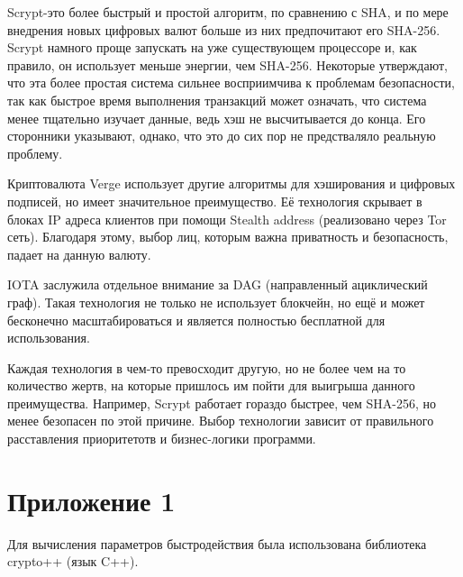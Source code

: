 \documentclass[russian, a4paper, 12pt]{article}
\begin{document}
Scrypt-это более быстрый и простой алгоритм, по сравнению с SHA, и по мере
внедрения новых цифровых валют больше из них предпочитают его SHA-256. Scrypt
намного проще запускать на уже существующем процессоре и, как правило, он
использует меньше энергии, чем SHA-256. Некоторые утверждают, что эта более
простая система сильнее восприимчива к проблемам безопасности, так как быстрое
время выполнения транзакций может означать, что система менее тщательно изучает
данные, ведь хэш не высчитывается до конца. Его сторонники указывают, однако,
что это до сих пор не предстваляло реальную проблему.

Криптовалюта Verge использует другие алгоритмы для хэширования и цифровых
подписей, но имеет значительное преимущество. Её технология скрывает в блоках
IP адреса клиентов при помощи Stealth address (реализовано через Tor сеть).
Благодаря этому, выбор лиц, которым важна приватность и безопасность, падает на
данную валюту.

IOTA заслужила отдельное внимание за DAG (направленный ациклический граф).
Такая технология не только не использует блокчейн, но ещё и может бесконечно
масштабироваться и является полностью бесплатной для использования.

Каждая технология в чем-то превосходит другую, но не более чем на то количество
жертв, на которые пришлось им пойти для выигрыша данного преимущества.
Например, Scrypt работает гораздо быстрее, чем SHA-256, но менее безопасен по
этой причине. Выбор технологии зависит от правильного расставления приоритетотв
и бизнес-логики программи.


\section{Приложение 1}
Для вычисления параметров быстродействия была использована библиотека crypto++
(язык C++).
\newpage
\thispagestyle{empty}



\end{document}
